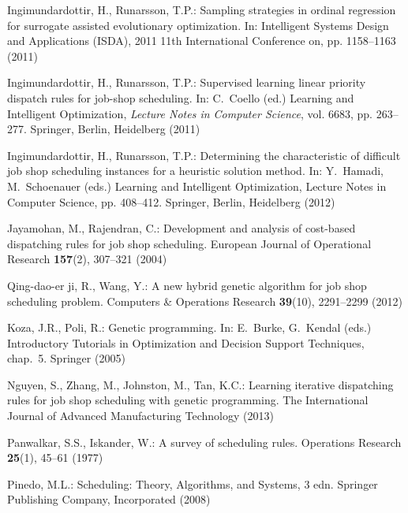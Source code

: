 \documentclass[graybox]{svmult}
\begin{document}
\begin{thebibliography}{10}
    Ingimundardottir, H., Runarsson, T.P.: Sampling strategies in ordinal
    regression for surrogate assisted evolutionary optimization.
    \newblock In: Intelligent Systems Design and Applications (ISDA), 2011 11th
    International Conference on, pp. 1158--1163 (2011)
    
    Ingimundardottir, H., Runarsson, T.P.: Supervised learning linear priority
    dispatch rules for job-shop scheduling.
    \newblock In: C.~Coello (ed.) Learning and Intelligent Optimization,
    \emph{Lecture Notes in Computer Science}, vol. 6683, pp. 263--277. Springer,
    Berlin, Heidelberg (2011)
    
    Ingimundardottir, H., Runarsson, T.P.: Determining the characteristic of
    difficult job shop scheduling instances for a heuristic solution method.
    \newblock In: Y.~Hamadi, M.~Schoenauer (eds.) Learning and Intelligent
    Optimization, Lecture Notes in Computer Science, pp. 408--412. Springer,
    Berlin, Heidelberg (2012)
    
    Jayamohan, M., Rajendran, C.: Development and analysis of cost-based
    dispatching rules for job shop scheduling.
    \newblock European Journal of Operational Research \textbf{157}(2), 307--321
    (2004)
    
    Qing-dao-er ji, R., Wang, Y.: {A new hybrid genetic algorithm for job shop
        scheduling problem}.
    \newblock Computers \& Operations Research \textbf{39}(10), 2291--2299 
    (2012)
    
    Koza, J.R., Poli, R.: {Genetic programming}.
    \newblock In: E.~Burke, G.~Kendal (eds.) Introductory Tutorials in 
    Optimization
    and Decision Support Techniques, chap.~5. Springer (2005)
    
    Nguyen, S., Zhang, M., Johnston, M., Tan, K.C.: {Learning iterative 
    dispatching
        rules for job shop scheduling with genetic programming}.
    \newblock The International Journal of Advanced Manufacturing Technology
    (2013)
    
    Panwalkar, S.S., Iskander, W.: A survey of scheduling rules.
    \newblock Operations Research \textbf{25}(1), 45--61 (1977)
    
    Pinedo, M.L.: Scheduling: Theory, Algorithms, and Systems, 3 edn.
    \newblock Springer Publishing Company, Incorporated (2008)
    

\end{thebibliography}
\end{document}

